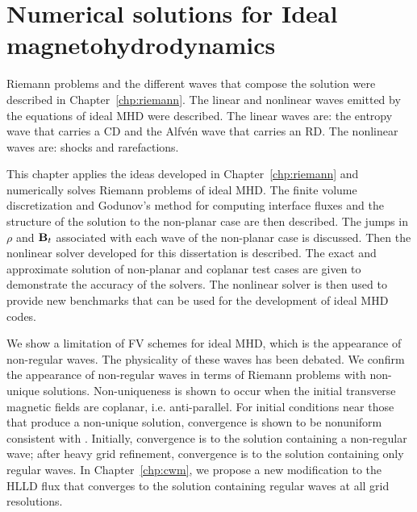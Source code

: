 %
%


\chapter[Numerical solutions for ideal magnetohydrodynamics]{Numerical solutions for Ideal magnetohydrodynamics}
\label{chp:num_mhd}

Riemann problems and the different waves that compose the solution were described in Chapter~\ref{chp:riemann}.  The linear and nonlinear waves emitted by the equations of ideal MHD were described.  The linear waves are: the entropy wave that carries a CD and the Alfv{\'e}n wave that carries an RD.  The nonlinear waves are: shocks and rarefactions.  

This chapter applies the ideas developed in Chapter~\ref{chp:riemann} and numerically solves Riemann problems of ideal MHD. The finite volume discretization and Godunov's method for computing interface fluxes and  the structure of the solution to the non-planar case are then described.  The jumps in $\rho$ and $\mathbf{B}_t$ associated with each wave of the non-planar case is discussed.  Then the nonlinear solver developed for this dissertation is described.  The exact and approximate solution of non-planar and coplanar test cases are given to demonstrate the accuracy of the solvers.  The nonlinear solver is then used to provide new benchmarks that can be used for the development of ideal MHD codes.  

We show a limitation of FV schemes for ideal MHD, which is the appearance of non-regular waves.  The physicality of these waves has been debated.  We confirm the appearance of non-regular waves in terms of Riemann problems with non-unique solutions.  Non-uniqueness is shown to occur when the initial transverse magnetic fields are coplanar, i.e. anti-parallel.  For initial conditions near those that produce a non-unique solution, convergence is shown to be nonuniform consistent with \citep{Torrilhon:2003b}.  Initially, convergence is to the solution containing a non-regular wave; after heavy grid refinement, convergence is to the solution containing only regular waves.  In Chapter~\ref{chp:cwm}, we propose a new modification to the HLLD flux that converges to the solution containing regular waves at all grid resolutions.   

